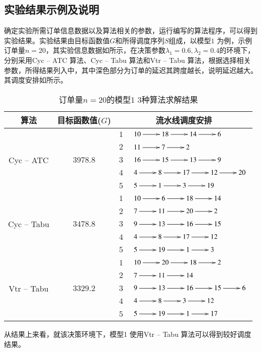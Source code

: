 \subsection{实验结果示例及说明}
确定实验所需订单信息数据以及算法相关的参数，运行编写的算法程序，可以得到实验结果。实验结果由目标函数值$G$和所得调度序列$S$组成，以模型$1$ 为例，示例订单量$n = 20$，其实验信息数据如所示，在决策参数$\lambda_1 = 0.6, \lambda_2 = 0.4$的环境下，分别采用Cyc -- ATC 算法、Cyc -- Tabu 算法和Vtr -- Tabu 算法，根据选择相关参数，所得结果列入中，其中深色部分为订单的延迟其跨度越长，说明延迟越大。
其调度安排如所示。
\begin{table}[h!]
  \centering
  \label{tab:resultmodel1}\caption{订单量$n = 20$的模型1 $3$种算法求解结果}
    \begin{tabular}{cccl}
    \toprule
    算法    & 目标函数值($G$) & \multicolumn{2}{c}{流水线调度安排} \\
    \midrule
    \multirow{5}[2]{*}{Cyc -- ATC} & \multirow{5}[2]{*}{$3978.8$} & $1$     &$\xymatrix{10 \ar[r] & 18 \ar[r] & 14 \ar[r] & 6}$\\
          &       & $2$     &  $\xymatrix{11 \ar[r] & 7 \ar[r] & 2}$\\
          &       & $3$     &  $\xymatrix{16 \ar[r] & 15 \ar[r] & 13 \ar[r] & 9}$\\
          &       & $4$     &  $\xymatrix{4 \ar[r] & 8 \ar[r] & 17 \ar[r] & 12 \ar[r]&20}$\\
          &       & $5$     &  $\xymatrix{5 \ar[r] & 1 \ar[r] & 3 \ar[r] & 19}$\\
     \hline
    \multirow{5}[2]{*}{Cyc -- Tabu} & \multirow{5}[2]{*}{$3478.8$} & $1$     &  $\xymatrix{10 \ar[r] & 6 \ar[r] & 18 \ar[r] & 14}$\\
          &       & $2$     & $\xymatrix{7 \ar[r] & 11 \ar[r] & 20 \ar[r] & 2}$ \\
          &       & $3$     &  $\xymatrix{9 \ar[r] & 13 \ar[r] & 16 \ar[r] & 15}$\\
          &       & $4$     &  $\xymatrix{4 \ar[r] & 8 \ar[r] & 17 \ar[r] & 12}$\\
          &       & $5$     &  $\xymatrix{5 \ar[r] & 19 \ar[r] & 1 \ar[r] & 3}$\\
       \hline
    \multirow{5}[2]{*}{Vtr -- Tabu} & \multirow{5}[2]{*}{$3329.2$} & $1$     &  $\xymatrix{10 \ar[r] & 20 \ar[r] & 18 \ar[r] & 2}$\\
          &       & $2$     & $\xymatrix{7 \ar[r] & 11 \ar[r] & 14 }$ \\
          &       & $3$     &  $\xymatrix{9 \ar[r] & 13 \ar[r] & 16 \ar[r] & 15\ar[r]&6}$\\
          &       & $4$     &  $\xymatrix{4\ar[r] & 8 \ar[r] & 3 \ar[r] & 12}$\\
          &       & $5$     &  $\xymatrix{5 \ar[r] & 19 \ar[r] & 1 \ar[r] & 17}$\\
    \bottomrule
    \end{tabular}
  \label{tab:resultexample20}
\end{table}

从结果上来看，就该决策环境下，模型1 使用Vtr -- Tabu 算法可以得到较好调度结果。
